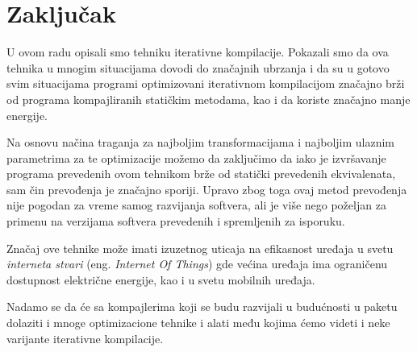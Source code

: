 \documentclass[a4paper]{article}
\begin{document}
\section{Zaključak}
\label{sec:zakljucak}
U ovom radu opisali smo tehniku iterativne kompilacije. 
Pokazali smo da ova tehnika u mnogim situacijama dovodi 
do značajnih ubrzanja i da su u gotovo svim situacijama 
programi optimizovani iterativnom kompilacijom značajno 
brži od programa kompajliranih statičkim metodama, kao i da koriste
značajno manje energije.
\par
Na osnovu načina traganja za najboljim transformacijama 
i najboljim ulaznim parametrima za te optimizacije možemo da zaključimo
da iako je izvršavanje programa prevedenih ovom tehnikom brže
od statički prevedenih ekvivalenata, sam čin prevođenja je značajno sporiji. 
Upravo zbog toga ovaj metod prevođenja nije pogodan za vreme samog
razvijanja softvera, 
ali je više nego poželjan za primenu na verzijama softvera prevedenih 
i spremljenih za isporuku.
\par
Značaj ove tehnike može imati izuzetnog uticaja
na efikasnost uređaja u svetu \emph{interneta stvari} (eng. \emph{Internet Of Things}) 
gde većina uređaja ima ograničenu dostupnost električne energije, kao i u svetu 
mobilnih uređaja.
\par
Nadamo se da će sa kompajlerima koji se budu razvijali u budućnosti u paketu 
dolaziti i mnoge optimizacione tehnike i alati među kojima ćemo videti i
neke varijante iterativne kompilacije.
\appendix
 

\end{document}
